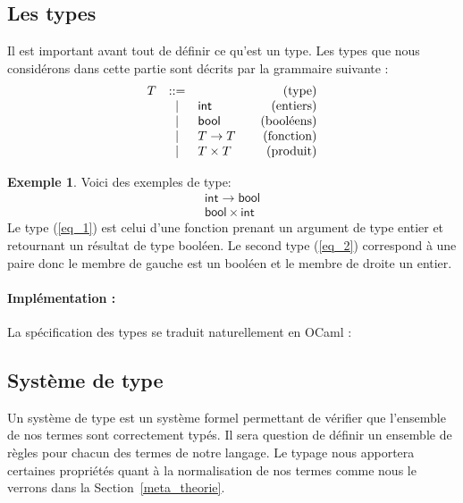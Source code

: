 \documentclass {article}
\makeatletter
\newcommand{\codefrom}[3]
           {}
\theoremstyle{definition}
\newtheorem{example}{Exemple}
\theoremstyle{remark}
\newenvironment{bnf}
               {\[\begin{array}{lcl@{\qquad}r}}
               {\end{array}\]}
\makeatother
\begin{document}
\subsection{Les types}
\label{simple_type}


\newcommand{\intg}{\ensuremath{\mathsf{int}}}
\newcommand{\bool}{\ensuremath{\mathsf{bool}}}

Il est important avant tout de définir ce qu'est un type. Les types
que nous considérons dans cette partie sont décrits par la grammaire
suivante :
%
\begin{bnf}
  T &::=& &\mbox{(type)}\\
  &|& \intg{} &\mbox{(entiers)}\\ 
  &|& \bool{} &\mbox{(booléens)}\\
  &|& T \rightarrow T &\mbox{(fonction)}\\
  &|& T \times T &\mbox{(produit)}\\
\end{bnf}

\begin{example}
  Voici des exemples de type:
  \begin{eqnarray}
    \intg \rightarrow \bool  \label{eq_1}  \\
    \bool \times \intg \label{eq_2} 
  \end{eqnarray}
  Le type (\ref{eq_1}) est celui d'une fonction prenant un argument de type entier et 
  retournant un résultat de type booléen.
  Le second type (\ref{eq_2}) correspond à une paire donc le membre de gauche est un booléen
  et le membre de droite un entier.
\end{example}

\paragraph{Implémentation :}

La spécification des types se traduit naturellement en OCaml :
%
\codefrom{typed}{lambda}{Type}


\subsection{Système de type}

Un système de type est un système formel permettant de vérifier que l'ensemble de nos termes sont
correctement typés. Il sera question de définir un ensemble de règles pour chacun des termes de notre langage.
Le typage nous apportera certaines propriétés quant à la normalisation de nos termes comme nous le verrons
dans la Section~\ref{meta_theorie}. 
\end{document}
